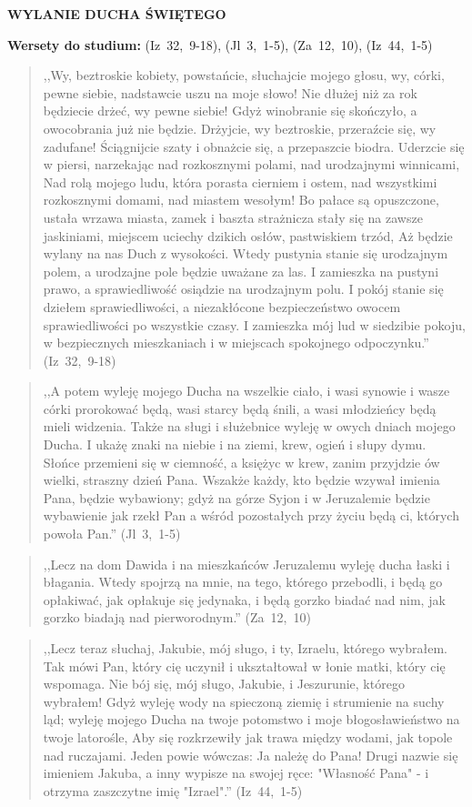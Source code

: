 \documentclass[10pt,a4paper,oneside]{article}
\begin{document}
\centerline{\textbf{\MakeUppercase{Wylanie Ducha Świętego}}}
\begin{center}
\textbf{Wersety do studium:} (Iz~32,~9-18), (Jl~3,~1-5), (Za~12,~10), (Iz~44,~1-5)
\end{center}
\begin{quote}
,,Wy, beztroskie kobiety, powstańcie, słuchajcie mojego głosu, wy, córki, pewne siebie, nadstawcie uszu na moje słowo! Nie dłużej niż za rok będziecie drżeć, wy pewne siebie! Gdyż winobranie się skończyło, a owocobrania już nie będzie. Drżyjcie, wy beztroskie, przeraźcie się, wy zadufane! Ściągnijcie szaty i obnażcie się, a przepaszcie biodra. Uderzcie się w piersi, narzekając nad rozkosznymi polami, nad urodzajnymi winnicami, Nad rolą mojego ludu, która porasta cierniem i ostem, nad wszystkimi rozkosznymi domami, nad miastem wesołym! Bo pałace są opuszczone, ustała wrzawa miasta, zamek i baszta strażnicza stały się na zawsze jaskiniami, miejscem uciechy dzikich osłów, pastwiskiem trzód, Aż będzie wylany na nas Duch z wysokości. Wtedy pustynia stanie się urodzajnym polem, a urodzajne pole będzie uważane za las. I zamieszka na pustyni prawo, a sprawiedliwość osiądzie na urodzajnym polu. I pokój stanie się dziełem sprawiedliwości, a niezakłócone bezpieczeństwo owocem sprawiedliwości po wszystkie czasy. I zamieszka mój lud w siedzibie pokoju, w bezpiecznych mieszkaniach i w miejscach spokojnego odpoczynku.'' (Iz~32,~9-18)
\end{quote}
\begin{quote}
,,A potem wyleję mojego Ducha na wszelkie ciało, i wasi synowie i wasze córki prorokować będą, wasi starcy będą śnili, a wasi młodzieńcy będą mieli widzenia. Także na sługi i służebnice wyleję w owych dniach mojego Ducha. I ukażę znaki na niebie i na ziemi, krew, ogień i słupy dymu. Słońce przemieni się w ciemność, a księżyc w krew, zanim przyjdzie ów wielki, straszny dzień Pana. Wszakże każdy, kto będzie wzywał imienia Pana, będzie wybawiony; gdyż na górze Syjon i w Jeruzalemie będzie wybawienie jak rzekł Pan a wśród pozostałych przy życiu będą ci, których powoła Pan.'' (Jl~3,~1-5)
\end{quote}
\begin{quote}
,,Lecz na dom Dawida i na mieszkańców Jeruzalemu wyleję ducha łaski i błagania. Wtedy spojrzą na mnie, na tego, którego przebodli, i będą go opłakiwać, jak opłakuje się jedynaka, i będą gorzko biadać nad nim, jak gorzko biadają nad pierworodnym.'' (Za~12,~10)
\end{quote}
\begin{quote}
,,Lecz teraz słuchaj, Jakubie, mój sługo, i ty, Izraelu, którego wybrałem. Tak mówi Pan, który cię uczynił i ukształtował w łonie matki, który cię wspomaga. Nie bój się, mój sługo, Jakubie, i Jeszurunie, którego wybrałem! Gdyż wyleję wody na spieczoną ziemię i strumienie na suchy ląd; wyleję mojego Ducha na twoje potomstwo i moje błogosławieństwo na twoje latorośle, Aby się rozkrzewiły jak trawa między wodami, jak topole nad ruczajami. Jeden powie wówczas: Ja należę do Pana! Drugi nazwie się imieniem Jakuba, a inny wypisze na swojej ręce: "Własność Pana" - i otrzyma zaszczytne imię "Izrael".'' (Iz~44,~1-5)
\end{quote}
\end{document}
